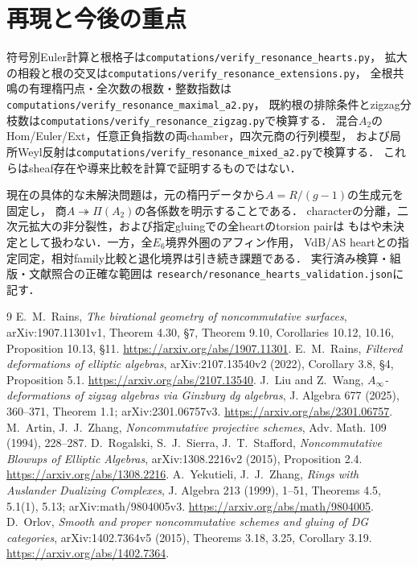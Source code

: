 \documentclass[11pt,a4paper]{ltjsarticle}
\theoremstyle{definition}\newtheorem{remark}[theorem]{注意}
\begin{document}
\section{再現と今後の重点}
符号別Euler計算と根格子は\texttt{computations/verify\_resonance\_hearts.py}，
拡大の相殺と根の交叉は\texttt{computations/verify\_resonance\_extensions.py}，
全根共鳴の有理楕円点・全次数の根数・整数指数は
\texttt{computations/verify\_resonance\_maximal\_a2.py}，
既約根の排除条件とzigzag分枝数は\texttt{computations/verify\_resonance\_zigzag.py}で検算する．
混合$A_2$のHom/Euler/Ext，任意正負指数の両chamber，四次元商の行列模型，
および局所Weyl反射は\texttt{computations/verify\_resonance\_mixed\_a2.py}で検算する．
これらはsheaf存在や導来比較を計算で証明するものではない．

現在の具体的な未解決問題は，元の楕円データから$A=R/(g-1)$の生成元を固定し，
商$A\twoheadrightarrow\Pi(A_2)$の各係数を明示することである．
characterの分離，二次元拡大の非分裂性，および指定gluingでの全heartのtorsion pairは
もはや未決定として扱わない．一方，全$E_6$境界外圏のアフィン作用，
VdB/AS heartとの指定同定，相対family比較と退化境界は引き続き課題である．
実行済み検算・組版・文献照合の正確な範囲は
\texttt{research/resonance\_hearts\_validation.json}に記す．

\begin{thebibliography}{9}
E.~M.~Rains, \emph{The birational geometry of noncommutative surfaces},
arXiv:1907.11301v1, Theorem 4.30, \S7, Theorem 9.10,
Corollaries 10.12, 10.16, Proposition 10.13, \S11.
\url{https://arxiv.org/abs/1907.11301}.
E.~M.~Rains, \emph{Filtered deformations of elliptic algebras},
arXiv:2107.13540v2 (2022), Corollary 3.8, \S4, Proposition 5.1.
\url{https://arxiv.org/abs/2107.13540}.
 J.~Liu and Z.~Wang,
\emph{$A_\infty$-deformations of zigzag algebras via Ginzburg dg algebras},
J. Algebra 677 (2025), 360--371, Theorem 1.1; arXiv:2301.06757v3.
\url{https://arxiv.org/abs/2301.06757}.
 M.~Artin, J.~J.~Zhang, \emph{Noncommutative projective schemes},
Adv. Math. 109 (1994), 228--287.
 D.~Rogalski, S.~J.~Sierra, J.~T.~Stafford,
\emph{Noncommutative Blowups of Elliptic Algebras},
arXiv:1308.2216v2 (2015), Proposition 2.4.
\url{https://arxiv.org/abs/1308.2216}.
 A.~Yekutieli, J.~J.~Zhang,
\emph{Rings with Auslander Dualizing Complexes},
J. Algebra 213 (1999), 1--51, Theorems 4.5, 5.1(1), 5.13;
arXiv:math/9804005v3. \url{https://arxiv.org/abs/math/9804005}.
 D.~Orlov,
\emph{Smooth and proper noncommutative schemes and gluing of DG categories},
arXiv:1402.7364v5 (2015), Theorems 3.18, 3.25, Corollary 3.19.
\url{https://arxiv.org/abs/1402.7364}.
\end{thebibliography}
\end{document}
